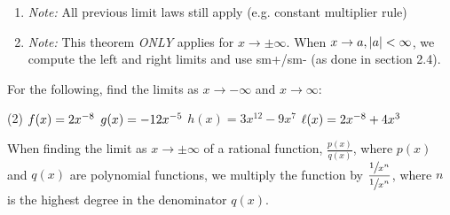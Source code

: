 \documentclass[answers]{exam}
\begin{document}
      \begin{center}
      \end{center}
      \begin{enumerate}[label=]
        \item \textit{Note:} All previous limit laws still apply (e.g. constant multiplier rule)
        \item \textit{Note:} This theorem \textit{ONLY} applies for $x\to\pm\infty$. When $x\to a, \abs{a}<\infty$, we compute the left and right limits and use sm+/sm- (as done in section 2.4).
      \end{enumerate}
      \begin{ex*}
        For the following, find the limits as $x\to-\infty$ and $x\to \infty$:
        \begin{tasks}[after-item-skip=\stretch{1}](2)
          \task[] $f(x)=2x\inv[8]$
          \task[] $g(x)=-12x\inv[5]$
          \task[] $h(x)=3x^{12}-9x^7$
          \task[] $\ell(x)=2x\inv[8]+4x^3$
        \end{tasks}
      \end{ex*}
      \pagebreak 
      
      When finding the limit as $x\to\pm\infty$ of a rational function, $\frac{p(x)}{q(x)}$, where $p(x)$ and $q(x)$ are polynomial functions, we multiply the function by $\dfrac{\sfrac{1}{x^n}}{\sfrac{1}{x^n}}$, where $n$ is the highest degree in the denominator $q(x)$.
      
\end{document}
